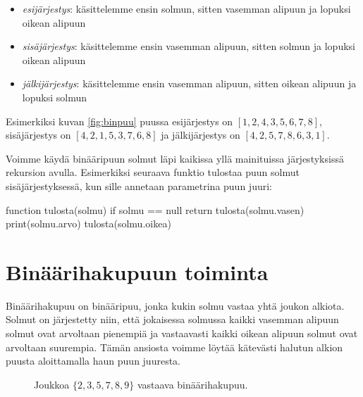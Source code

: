 \begin{itemize}
\item \emph{esijärjestys}: käsittelemme ensin solmun, sitten vasemman alipuun
ja lopuksi oikean alipuun
\item \emph{sisäjärjestys}: käsittelemme ensin vasemman alipuun, sitten solmun
ja lopuksi oikean alipuun
\item \emph{jälkijärjestys}: käsittelemme ensin vasemman alipuun,
sitten oikean alipuun ja lopuksi solmun
\end{itemize}

Esimerkiksi kuvan \ref{fig:binpuu} puussa
esijärjestys on $[1,2,4,3,5,6,7,8]$,
sisäjärjes\-tys on $[4,2,1,5,3,7,6,8]$ ja
jälkijärjestys on $[4,2,5,7,8,6,3,1]$.

Voimme käydä binääripuun solmut läpi kaikissa yllä mainituissa
järjes\-tyksissä rekursion avulla.
Esimerkiksi seuraava funktio tulostaa puun solmut
sisäjärjestyksessä, kun sille annetaan parametrina
puun juuri:

\begin{code}
function tulosta(solmu)
    if solmu == null
        return
    tulosta(solmu.vasen)
    print(solmu.arvo)
    tulosta(solmu.oikea)
\end{code}

\section{Binäärihakupuun toiminta}

Binäärihakupuu on binääripuu, jonka kukin solmu
vastaa yhtä joukon alkiota.
Solmut on järjestetty niin, että jokaisessa solmussa
kaikki vasemman alipuun solmut ovat arvoltaan pienempiä
ja vastaavasti kaikki oikean alipuun solmut
ovat arvoltaan suurempia.
Tämän ansiosta voimme löytää kätevästi halutun
alkion puusta aloittamalla haun puun juuresta.

\begin{figure}
\center
{}
\caption{Joukkoa $\{2,3,5,7,8,9\}$ vastaava binäärihakupuu.}
\label{fig:bihpuu}
\end{figure}

